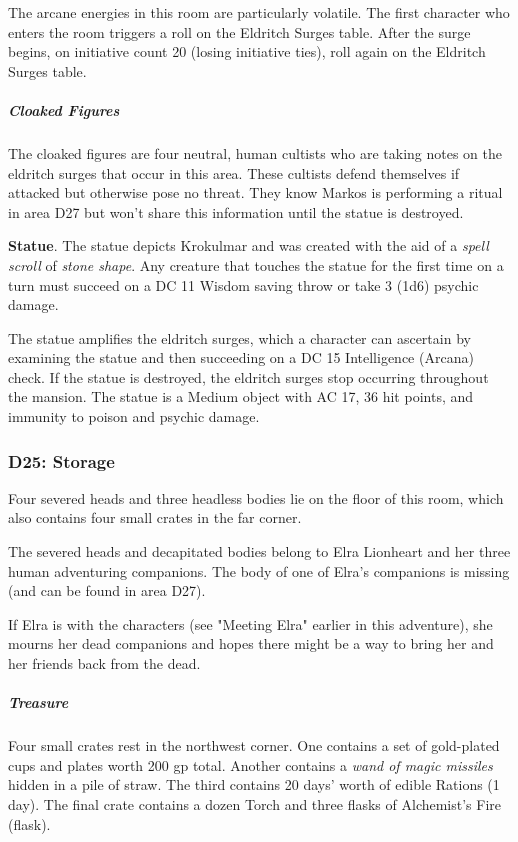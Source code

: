 \documentclass[10pt,a4paper,twoside,bg=print,twocolumn,openany,nodeprecatedcode]{dndbook}
\begin{document}
The arcane energies in this room are particularly volatile. The first character who enters the room triggers a roll on the Eldritch Surges table. After the surge begins, on initiative count 20 (losing initiative ties), roll again on the Eldritch Surges table.

\subparagraph{Cloaked Figures}
The cloaked figures are four neutral, human cultists who are taking notes on the eldritch surges that occur in this area. These cultists defend themselves if attacked but otherwise pose no threat. They know Markos is performing a ritual in area D27 but won't share this information until the statue is destroyed.

\textbf{Statue}. The statue depicts Krokulmar and was created with the aid of a \textit{spell scroll} of \textit{stone shape}. Any creature that touches the statue for the first time on a turn must succeed on a DC 11 Wisdom saving throw or take 3 (1d6) psychic damage.

The statue amplifies the eldritch surges, which a character can ascertain by examining the statue and then succeeding on a DC 15 Intelligence (Arcana) check. If the statue is destroyed, the eldritch surges stop occurring throughout the mansion. The statue is a Medium object with AC 17, 36 hit points, and immunity to poison and psychic damage.

\subsubsection{D25: Storage}
\begin{DndReadAloud}{}
Four severed heads and three headless bodies lie on the floor of this room, which also contains four small crates in the far corner.

\end{DndReadAloud}

The severed heads and decapitated bodies belong to Elra Lionheart and her three human adventuring companions. The body of one of Elra's companions is missing (and can be found in area D27).

If Elra is with the characters (see "Meeting Elra" earlier in this adventure), she mourns her dead companions and hopes there might be a way to bring her and her friends back from the dead.

\subparagraph{Treasure}
Four small crates rest in the northwest corner. One contains a set of gold-plated cups and plates worth 200 gp total. Another contains a \textit{wand of magic missiles} hidden in a pile of straw. The third contains 20 days' worth of edible Rations (1 day). The final crate contains a dozen Torch and three flasks of Alchemist's Fire (flask).
\end{document}
